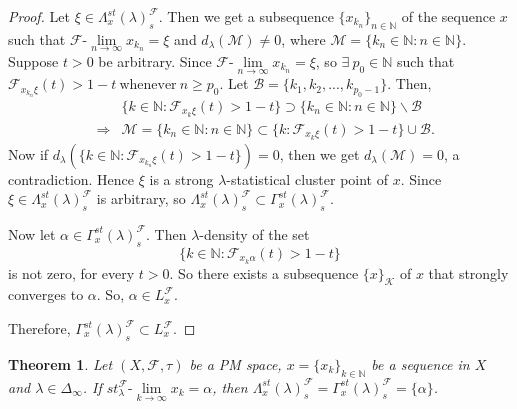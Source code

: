 \documentclass[reqno,b5paper]{amsart}
\theoremstyle{plain}
\newtheorem{thm}{Theorem}[section]
\theoremstyle{definition}
\begin{document}
\begin{proof}
Let $\xi \in \Lambda_x^{st}(\lambda)^\mathcal{F}_{s}$. Then we get
a subsequence $\{x_{k_n}\}_{n\in \mathbb N}$ of the  sequence $x$
such that $\mathcal{F}\mbox{-}\lim\limits_{n\rightarrow
\infty}x_{k_n}=\xi$ and $d_\lambda(\mathcal{M})\neq 0$, where
$\mathcal{M} = \{k_n\in\mathbb {N}: n\in\mathbb {N}\}$. Suppose
$t>0$ be arbitrary. Since
$\mathcal{F}\mbox{-}\lim\limits_{n\rightarrow \infty}x_{k_n}=\xi$,
so $\exists~ p_0\in\mathbb N$ such that
$\mathcal{F}_{x_{k_n}\xi}(t)>1-t~\text{whenever}~ n\geq p_0$. Let
$\mathcal{B}=\{k_1,k_2,...,k_{p_0-1}\}$. Then,
\begin{eqnarray*}
&~&
\{k\in\mathbb{N}:\mathcal{F}_{x_{k}\xi}(t)>1-t\}\supset \{k_n\in\mathbb{N}: n \in \mathbb{N}\}\backslash \mathcal{B}\\
&\Rightarrow & \mathcal{M}=\{k_n\in\mathbb{N}:n\in \mathbb
N\}\subset \{k:\mathcal{F}_{x_{k}\xi}(t)>1-t\}\cup\mathcal{B}.
\end{eqnarray*}
Now if $d_\lambda(\{k\in
\mathbb{N}:\mathcal{F}_{x_{k_n}\xi}(t)>1-t\})=0$, then we get
$d_\lambda(\mathcal{M})=0$, a contradiction. Hence $\xi$ is a
strong $\lambda$-statistical cluster point of $x$. Since $\xi \in
\Lambda_x^{st}(\lambda)^\mathcal{F}_{s}$ is arbitrary, so
$\Lambda_x^{st}(\lambda)^\mathcal{F}_{s}\subset\Gamma_x^{st}(\lambda)^\mathcal{F}_{s}$.

Now let $\alpha\in\Gamma_x^{st}(\lambda)^\mathcal{F}_{s}$. Then
$\lambda$-density of the set
$$\{k\in\mathbb{N}:\mathcal{F}_{x_k\alpha}(t)>1-t\}$$ is not zero, for every $t>0$.
So there exists a subsequence $\{x\}_\mathcal{K}$ of $x$ that
strongly converges to $\alpha$. So, $\alpha\in L^\mathcal{F}_x$.

Therefore, $\Gamma_x^{st}(\lambda)^\mathcal{F}_{s}\subset
L^\mathcal{F}_x$.
\end{proof}
\begin{thm}
Let $(X,\mathcal{F},\tau)$ be a PM space, $x=\{x_k\}_{k
\in\mathbb{N}}$ be a sequence in $X$ and
$\lambda\in\Delta_\infty$. If
$st^\mathcal{F}_\lambda\mbox{-}\lim\limits_{k\rightarrow
\infty}x_k = \alpha$, then
$\Lambda_x^{st}(\lambda)^\mathcal{F}_{s}=\Gamma_x^{st}(\lambda)^\mathcal{F}_{s}=\{\alpha\}$.
\end{thm}
\end{document}
